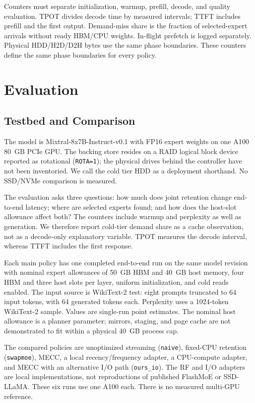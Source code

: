 \documentclass[conference,9pt,letterpaper]{IEEEtran}
\begin{document}
Counters must separate initialization, warmup, prefill, decode, and quality evaluation. TPOT divides decode time by measured intervals; TTFT includes prefill and the first output. Demand-miss share is the fraction of selected-expert arrivals without ready HBM/CPU weights. In-flight prefetch is logged separately. Physical HDD/H2D/D2H bytes use the same phase boundaries. These counters define the same phase boundaries for every policy.

\section{Evaluation}
\label{sec:evaluation}
\subsection{Testbed and Comparison}
The model is Mixtral-8x7B-Instruct-v0.1 with FP16 expert weights on one A100 80~GB PCIe GPU. The backing store resides on a RAID logical block device reported as rotational (\texttt{ROTA=1}); the physical drives behind the controller have not been inventoried. We call the cold tier HDD as a deployment shorthand. No SSD/NVMe comparison is measured.

The evaluation asks three questions: how much does joint retention change end-to-end latency; where are selected experts found; and how does the host-slot allowance affect both? The counters include warmup and perplexity as well as generation. We therefore report cold-tier demand share as a cache observation, not as a decode-only explanatory variable. TPOT measures the decode interval, whereas TTFT includes the first response.

Each main policy has one completed end-to-end run on the same model revision with nominal expert allowances of 50~GB HBM and 40~GB host memory, four HBM and three host slots per layer, uniform initialization, and cold reads enabled. The input source is WikiText-2 test: eight prompts truncated to 64 input tokens, with 64 generated tokens each. Perplexity uses a 1024-token WikiText-2 sample. Values are single-run point estimates. The nominal host allowance is a planner parameter; mirrors, staging, and page cache are not demonstrated to fit within a physical 40~GB process cap.

The compared policies are unoptimized streaming (\texttt{naive}), fixed-CPU retention (\texttt{swapmoe}), MECC, a local recency/frequency adapter, a CPU-compute adapter, and MECC with an alternative I/O path (\texttt{ours\_io}). The RF and I/O adapters are local implementations, not reproductions of published FlashMoE or SSD-LLaMA. These six runs use one A100 each. There is no measured multi-GPU reference.
\end{document}
